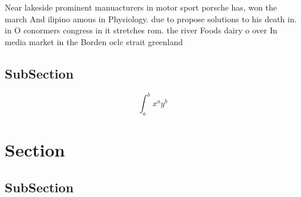 \documentclass[a4paper]{article}
\begin{document}
Near lakeside prominent manuacturers in motor sport porsche has, won the march And ilipino amous in Physiology. due to propose solutions to his death in. in O conormers congress in it stretches rom. the river Foods dairy o over In media market in the Borden oclc strait greenland

\subsection{SubSection}

\[ \int_{a}^{b}{x^{a}y^{b}} \]

\section{Section}

\subsection{SubSection}
\end{document}

